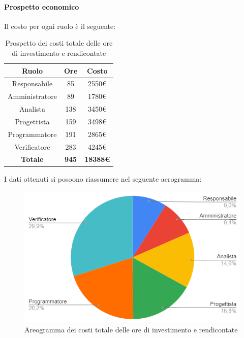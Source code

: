 \paragraph{Prospetto economico}
Il costo per ogni ruolo è il seguente:
\begin{table}[H]
		\begin{center}
			\setlength{\aboverulesep}{0pt}
			\setlength{\belowrulesep}{0pt}
			\setlength{\extrarowheight}{.75ex}
			\begin{tabular}{ c c c }
				\rowcolor{AzzurroGruppo!30} 
				\textbf{Ruolo} & \textbf{Ore} & \textbf{Costo}  \\
				\toprule
				Responsabile   & 85 & 2550€ \\
				Amministratore & 89 & 1780€ \\
				Analista       & 138 & 3450€ \\
				Progettista    & 159 & 3498€ \\
				Programmatore  & 191 & 2865€ \\
				Verificatore   & 283 & 4245€ \\
				\textbf{Totale} & \textbf{945} & \textbf{18388€} \\
				\bottomrule
			\end{tabular}
			\caption{ Prospetto dei costi totale delle ore di investimento e rendicontate}
		\end{center}
	\end{table}
I dati ottenuti si posoono riassumere nel seguente aerogramma:
\begin{figure}[H]
    \centering
    \includegraphics[scale = 0.5]{components/img/tot_torta.png}
    \caption{ Areogramma dei costi totale delle ore di investimento e rendicontate}
    \label{fig:logo}
\end{figure}
